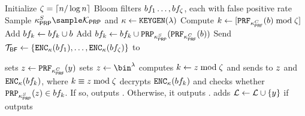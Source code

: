 \begin{algorithm}
\begin{algorithmic}[1]
\Statex{}
\State Initialize $\zeta = \lceil n/ \log n \rceil$ Bloom filters $\bloomFilter[1] \dots, \bloomFilter[\numBins]$, each with false positive rate \bloomFilterEpsilon 
\State Sample $\prpKeyServer \sample \prpKeySpace$ and $\genericSymmKey \assign \encryptKeyGen(\secParam)$
\State Compute $\bloomFilterIdx \assign [\prf{\prfKeyClient}(\genericBlocklistElmt) \bmod \numBins]$
\State Add $\bloomFilter[\bloomFilterIdx] \assign \bloomFilter[\bloomFilterIdx] \cup \genericBlocklistElmt$
\State Add $\bloomFilter[\bloomFilterIdx] \assign \bloomFilter[\bloomFilterIdx] \cup \prp{\prpKeyServer}(\prf{\prfKeyClient}(\genericBlocklistElmt))$
\EndFor
\State Send $\bfBlklistToken \assign \{\encrypt[\genericSymmKey](\bloomFilter[1]), \dots, \encrypt[\genericSymmKey](\bloomFilter[\numBins])\}$ to \client

\EndProcedure


\Statex\Procedure{\searchBlocklist}{\genericCInputElmt, \bfBlklistToken}

\If{$\genericCInputElmt \notin \prevHashList$}
\State \client sets $\genericCInputElmtPRFEval \assign \prf{\prfKeyClient}(\genericCInputElmt)$
\Else 
\State \client sets $\genericCInputElmtPRFEval \assign \bin^{\secParam}$
\EndIf
\State \client computes $k \gets z \bmod \zeta$ and sends to \server $z$ and $\encrypt[\genericSymmKey](\bloomFilter[\bloomFilterIdx])$, where $k \equiv z \bmod \zeta$
\State \server decrypts $\encrypt[\genericSymmKey](\bloomFilter[\bloomFilterIdx])$ and checks whether $\prp{\prpKeyServer}(\genericCInputElmtPRFEval) \in \bloomFilter[\bloomFilterIdx]$. If so, \server  outputs \tru. Otherwise, it outputs \fals. 
\State \client adds $\prevHashList \assign \prevHashList \cup \{\genericCInputElmt\}$ if \server outputs \fals
\EndProcedure
\end{algorithmic}
\end{algorithm}


